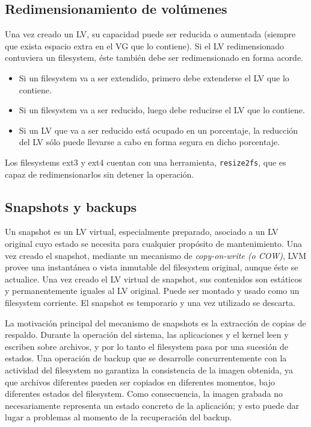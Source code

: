 \subsection{Redimensionamiento de volúmenes}
\label{sub:redimVol}
Una vez creado un LV, su capacidad puede ser reducida o aumentada (siempre que exista espacio extra en el VG que lo contiene). 
Si el LV redimensionado contuviera un filesystem, éste también debe ser redimensionado en forma acorde. 
\begin{itemize}
	\item Si un filesystem va a ser extendido, primero debe extenderse el LV que lo contiene. 
	\item Si un filesystem va a ser reducido, luego debe reducirse el LV que lo contiene. 
	\item Si un LV que va a ser reducido está ocupado en un porcentaje, la reducción del LV sólo puede llevarse a cabo en forma segura en dicho porcentaje. 

\end{itemize}
Los filesystems ext3 y ext4 cuentan con una herramienta, \lstinline$resize2fs$, que es capaz de redimensionarlos sin detener la operación.

\subsection{Snapshots y backups}
\label{sub:snapshots}

Un snapshot es un LV virtual, especialmente preparado, asociado a un LV original cuyo estado se necesita  para cualquier propósito de mantenimiento. Una vez creado el snapshot, mediante un mecanismo de \emph{copy-on-write (o COW)}, LVM provee una instantánea o vista inmutable del filesystem original, aunque éste se actualice. Una vez creado el LV virtual de snapshot, sus contenidos son estáticos y permanentemente iguales al LV original. Puede ser montado y usado como un filesystem corriente. El snapshot es temporario y una vez utilizado se descarta. 

La motivación principal del mecanismo de snapshots es la extracción de copias de respaldo. Durante la operación del sistema, las aplicaciones y el kernel leen y escriben sobre archivos, y por lo tanto el filesystem pasa por una sucesión de estados. Una operación de backup que se desarrolle concurrentemente con la actividad del filesystem no garantiza la consistencia de la imagen obtenida, ya que archivos diferentes pueden ser copiados en diferentes momentos, bajo diferentes estados del filesystem. Como consecuencia, la imagen grabada no necesariamente representa un estado concreto de la aplicación; y esto puede dar lugar a problemas al momento de la recuperación del backup. 

